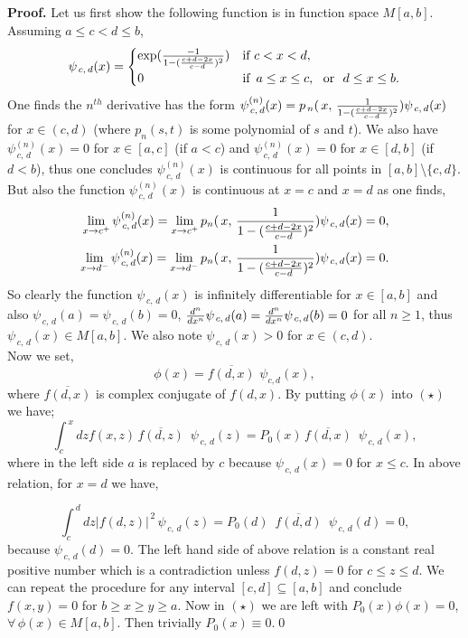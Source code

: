 \documentclass[10pt]{article}
\newcommand{\be}{\begin{equation}}
\newcommand{\ee}{\end{equation}}
\newcommand{\bea}{\begin{eqnarray}}
\newcommand{\eea}{\end{eqnarray}}
\newcommand{\nn}{\nonumber}
\begin{document}
{{{\bf Proof.} Let us first show the following function is in function
space $M[a,b]$. Assuming $a\le c< d \le b$,
\be\psi_{\,c,\,d}(x)=\begin{cases}\exp({{-1\over{1-({c+d-2x\over{c-d}}
)^2}}})&\text{if}\,\, c< x <d,\\0 &\text{if} \,\,\,a\leq x \leq c,
\,\,\,\,\text{or}\,\,\,\, d\leq x \leq b.
\end{cases}\label{hossein}\ee One finds the $n^{th}$ derivative has the form
$\psi^{(n)}_{\,c,\,d}(x)=p_{\,n}(\,x,\,{1\over{1-({c+d-2x\over{c-d}}
)^2}})\psi_{\,c,\,d}(x)$ for $x\in(c,d)$ (where $p_{n}(s,t)$ is some
polynomial of $s$ and $t$). We also have $\psi^{(n)}_{\,c,\,d}(x)=0$
for $x\in[a,c]$ (if $a<c$) and $\psi^{(n)}_{\,c,\,d}(x)=0$ for
$x\in[d,b]$ (if $d<b$), thus one concludes $\psi^{(n)}_{\,c,\,d}(x)$
is continuous for all points in $[a,b]$\textbackslash$\{c,d\}$. But
also the function $\psi^{(n)}_{\,c,\,d}(x)$ is continuous at $x=c$
and $x=d$ as one finds, \bea \lim_{x\to
c^+}\psi^{(n)}_{\,c,\,d}(x)=\lim_{x\to c^+}
p_{n}(\,x,\,{1\over{1-({c+d-2x\over{c-d}}
)^2}})\psi_{\,c,\,d}(x)=0,\nn\\\lim_{x\to
d^-}\psi^{(n)}_{\,c,\,d}(x)=\lim_{x\to d^-}
p_{n}(\,x,\,{1\over{1-({c+d-2x\over{c-d}} )^2}})\psi_{\,c,\,d}(x)=0.
\nn\eea So clearly the function $\psi_{\,c,\,d}(x)$ is infinitely
differentiable for $x\in[a,b]$ and also
$\psi_{\,c,\,d}(a)=\psi_{\,c,\,d}(b)=0$, ${d^{n}\over
dx^{n}}\psi_{\,c,\,d}(a)={d^{n}\over dx^{n}}\psi_{\,c,\,d}(b)=0$ for
all $n\ge1$, thus $\psi_{\,c,\,d}(x)\in M[a,b]$. We also note
$\psi_{\,c,\,d}(x)>0$ for $x\in(c,d)$. \\ Now we set, \be
\phi(x)=\overline{f(d,x)}\,\,\psi_{c,d}(x),\nn\ee where
$\overline{f(d,x)}$ is complex conjugate of $f(d,x)$. By putting
$\phi(x)$ into $(\star)$ we have; \be \int^{\,x}_{c} dz
f(x,z)\,\overline{f(d,z)}\,\,\,\psi_{\,c,\,d}(z) =P_{0}(x)
\,\overline{f(d,x)}\,\,\,\psi_{\,c,\,d}(x),\nn\ee where in the left
side $a$ is replaced by $c$ because $\psi_{\,c,\,d}(x)=0$ for $x\le
c$. In above relation, for $x=d$ we have,

\be \int^{\,d}_{c} dz |f(d,z)|^{\,2}\,\psi_{\,c,\,d}(z) =P_{0}(d)
\,\,\,\overline{f(d,d)}\,\,\,\psi_{\,c,\,d}(d)=0,\label{ferferi}\nn\ee
because $\psi_{\,c,\,d}(d)=0$. The left hand side of above relation
is a constant real positive number which is a contradiction unless
$f(d,z)=0$ for $c\le z \le d$. We can repeat the procedure for any
interval $[c,d]\subseteq[a,b]$ and conclude $f(x,y)=0$ for $b \geq
x\geq y\geq a$. Now in $(\star)$ we are left with
$P_{0}(x)\phi(x)=0$, $\forall\, \phi(x)\in M[a,b]$.
Then trivially $P_{0}(x)\equiv 0$.\qed \\



}}
\end{document}
